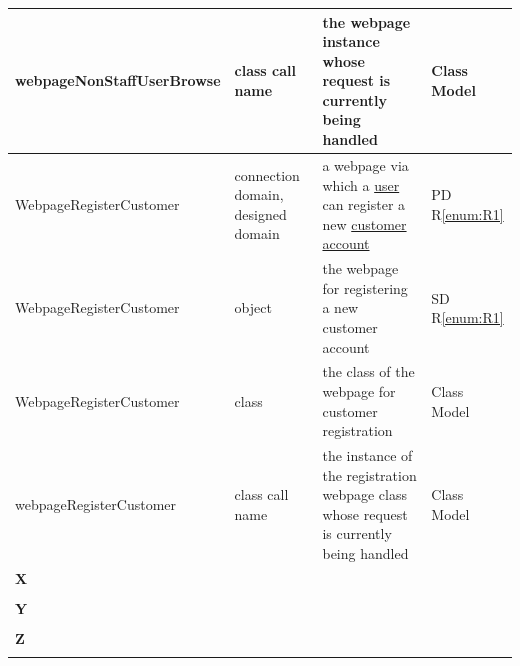 \documentclass[a4paper,10pt,titlepage,bibtotoc,bibtotocnumbered]{scrreprt}
\begin{document}
\begin{longtable}{|p{4.75cm}|p{3cm}|p{5cm}|l|}
\hline
webpageNonStaffUserBrowse & class call name & the webpage instance whose request is currently being handled & Class Model\\
\hline
\hypertarget{glossary:WebpageRegisterCustomer}{WebpageRegisterCustomer} & connection domain, designed domain & a webpage via which a \hyperlink{glossary:User}{user} can register a new \hyperlink{glossary:Customer}{customer account} & PD R\ref{enum:R1}\\
\hline
WebpageRegisterCustomer & object & the webpage for registering a new customer account & SD R\ref{enum:R1}\\
\hline
WebpageRegisterCustomer & class & the class of the webpage for customer registration & Class Model\\
\hline
webpageRegisterCustomer & class call name & the instance of the registration webpage class whose request is currently being handled & Class Model\\
\hline
\multicolumn{4}{|l|}{\textbf{X}}\\
\hline
&  &  & \\
\hline
\multicolumn{4}{|l|}{\textbf{Y}}\\
\hline
&  &  & \\
\hline
\multicolumn{4}{|l|}{\textbf{Z}}\\
\hline
&  &  & \\
\hline
\end{longtable}
\end{document}
